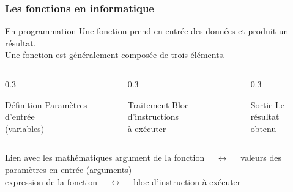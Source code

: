 \documentclass[10pt]{beamer}
\begin{document}
\begin{frame}
	\frametitle{Les fonctions en informatique}
	
	\begin{block}{En programmation}
	         Une fonction prend en entrée des données et produit un résultat.\\
		Une fonction est généralement composée de trois éléments. 
	\end{block}
	
	\vspace{0.15cm}
	
	\begin{columns}[T]
		\begin{column}{0.3\textwidth}
			\begin{exampleblock}{Définition}
				\centering
				Paramètres d'entrée\\
				(variables)
			\end{exampleblock}
		\end{column}
		
		\begin{column}{0.3\textwidth}
			\begin{exampleblock}{Traitement}
				\centering
				Bloc d'instructions\\
				à exécuter
			\end{exampleblock}
		\end{column}
		
		\begin{column}{0.3\textwidth}
			\begin{exampleblock}{Sortie}
				\centering
				Le résultat\\
				obtenu
			\end{exampleblock}
		\end{column}
	\end{columns}
	
	\vspace{0.2cm}
	
	
		\begin{exampleblock}{Lien avec les mathématiques}
		\centering
	argument de la fonction  $\quad\longleftrightarrow\quad$
valeurs des paramètres en entrée (arguments)\\
\hspace*{-2.5 cm}
		expression de la fonction
		$\quad\longleftrightarrow\quad$
	bloc d'instruction à exécuter
	\end{exampleblock}
	
		
\end{frame}
\end{document}
